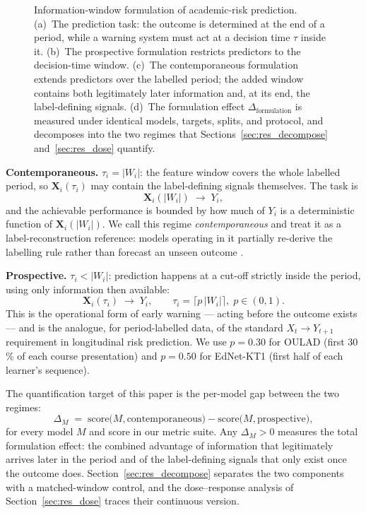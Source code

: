 \documentclass[sn-mathphys,Numbered]{sn-jnl}
\begin{document}
\begin{figure}[ht]
  \centering
  \resizebox{\textwidth}{!}{}
  \caption{Information-window formulation of academic-risk prediction. (a)~The prediction task: the outcome is determined at the end of a period, while a warning system must act at a decision time $\tau$ inside it. (b)~The prospective formulation restricts predictors to the decision-time window. (c)~The contemporaneous formulation extends predictors over the labelled period; the added window contains both legitimately later information and, at its end, the label-defining signals. (d)~The formulation effect $\Delta_{\mathrm{formulation}}$ is measured under identical models, targets, splits, and protocol, and decomposes into the two regimes that Sections~\ref{sec:res_decompose} and~\ref{sec:res_dose} quantify.}
  \label{fig:conceptual}
\end{figure}

\textbf{Contemporaneous.} $\tau_i = |W_i|$: the feature window covers the whole labelled period, so $\mathbf{X}_i(\tau_i)$ may contain the label-defining signals themselves. The task is
\begin{equation}
  \mathbf{X}_i(|W_i|) \;\longrightarrow\; Y_i,
\end{equation}
and the achievable performance is bounded by how much of $Y_i$ is a deterministic function of $\mathbf{X}_i(|W_i|)$. We call this regime \emph{contemporaneous} and treat it as a label-reconstruction reference: models operating in it partially re-derive the labelling rule rather than forecast an unseen outcome \cite{Kaufman2012}.

\textbf{Prospective.} $\tau_i < |W_i|$: prediction happens at a cut-off strictly inside the period, using only information then available:
\begin{equation}
  \mathbf{X}_i(\tau_i) \;\longrightarrow\; Y_i, \qquad \tau_i = \lceil p \, |W_i| \rceil,\; p \in (0,1).
\end{equation}
This is the operational form of early warning --- acting before the outcome exists --- and is the analogue, for period-labelled data, of the standard $X_t \rightarrow Y_{t+1}$ requirement in longitudinal risk prediction. We use $p = 0.30$ for OULAD (first 30\,\% of each course presentation) and $p = 0.50$ for EdNet-KT1 (first half of each learner's sequence).

The quantification target of this paper is the per-model gap between the two regimes:
\begin{equation}
  \Delta_M \;=\; \mathrm{score}\big(M, \text{contemporaneous}\big) - \mathrm{score}\big(M, \text{prospective}\big),
\end{equation}
for every model $M$ and score in our metric suite. Any $\Delta_M > 0$ measures the total formulation effect: the combined advantage of information that legitimately arrives later in the period and of the label-defining signals that only exist once the outcome does. Section~\ref{sec:res_decompose} separates the two components with a matched-window control, and the dose--response analysis of Section~\ref{sec:res_dose} traces their continuous version.
\end{document}
